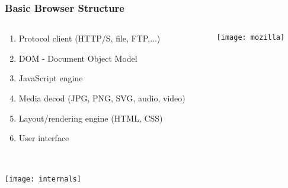 \documentclass[
	notes=none,
	aspectratio=169
]{beamer}
\begin{document}

\begin{frame}
\frametitle{Basic Browser Structure}

\begin{columns}[T]
\begin{column}[T]{0.5\textwidth}
\setlength{\parskip}{0.5em}

\vspace{1.5cm}
\begin{enumerate}
\setlength{\parskip}{0.5em}
\item Protocol client (HTTP/S, file, FTP,...)
\item DOM - Document Object Model
\item JavaScript engine
\item Media decod (JPG, PNG, SVG, audio, video)
\item Layout/rendering engine (HTML, CSS)
\item User interface
\end{enumerate}

\end{column}
\begin{column}[T]{0.5\textwidth}
\setlength{\parskip}{0.5em}

\vspace{0.5cm}
\texttt{[image: mozilla]}

\end{column}
\end{columns}

\end{frame}
\note{
\begin{enumerate}
\item -
\end{enumerate}
}


\begin{frame}
\frametitle{}

\begin{columns}[T]
\begin{column}[T]{1.0\textwidth}

\vspace{0.2cm}
\texttt{[image: internals]}

\end{column}
\end{columns}

\end{frame}
\end{document}
